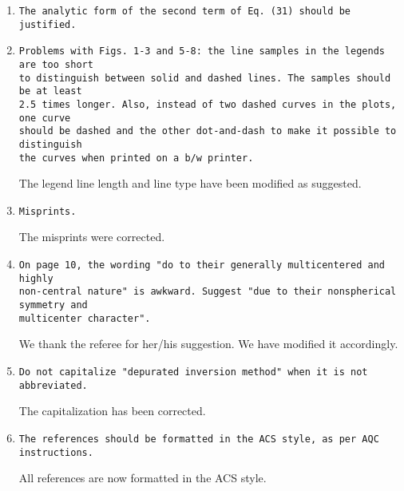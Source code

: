 \documentclass[10pt]{article}
\begin{document}
\begin{enumerate}
 \item {\tt The analytic form of the second term of Eq. (31) should
 be justified.}
 
 \item {\tt Problems with Figs.~1-3 and 5-8: the line samples in
 the legends are too short \\ to distinguish between solid and
 dashed lines. The samples should be at least \\ 2.5 times longer.
 Also, instead of two dashed curves in the plots, one curve \\
 should be dashed and the other dot-and-dash to make it possible to
 distinguish \\ the curves when printed on a b/w printer.}
 
 The legend line length and line type have been modified as 
 suggested.
 
 \item {\tt Misprints.}
 
 The misprints were corrected. 
 
 \item {\tt On page 10, the wording "do to their generally
 multicentered and highly \\ non-central nature" is awkward.
 Suggest "due to their nonspherical symmetry and \\ multicenter
 character".}
 
 We thank the referee for her/his suggestion. We have modified it
 accordingly.
 
 \item {\tt Do not capitalize "depurated inversion method" when it
 is not abbreviated.}
 
 The capitalization has been corrected.

 \item {\tt The references should be formatted in the ACS style, as 
 per AQC instructions.}
 
 All references are now formatted in the ACS style.
 
\end{enumerate}
\end{document}
